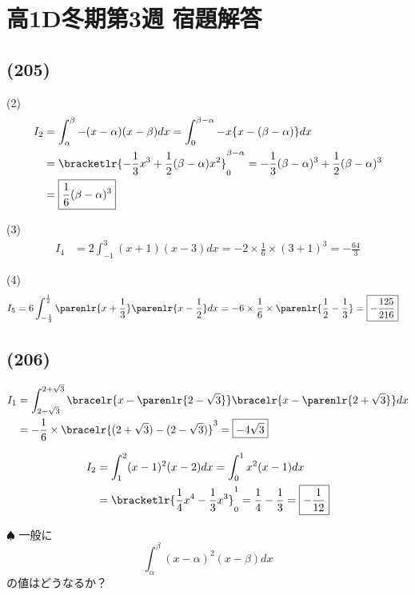 \documentclass[dvipdfmx,uplatex,b5paper]{jsarticle}
\begin{document}
\section*{高1D冬期第3週 宿題解答}
\subsection*{(205)}
\begin{enumarabicp}
  \item[(2)] \begin{align*}
    I_2 &= \int_\alpha^\beta -(x-\alpha)(x-\beta)dx
        = \int_0^{\beta-\alpha} -x\{x-(\beta-\alpha)\}dx \\
        &= \bracketlr{-\frac{1}{3}x^3+\frac{1}{2}(\beta-\alpha)x^2}_0^{\beta-\alpha}
        = -\frac{1}{3}(\beta-\alpha)^3+\frac{1}{2}(\beta-\alpha)^3 \\
        &= \boxed{\frac{1}{6}(\beta-\alpha)^3}
  \end{align*}
  \item[(3)] \begin{align*}
    I_4 &= 2\int_{-1}^3 (x+1)(x-3)dx 
        = -2\times \frac{1}{6}\times (3+1)^3 
        = \boxed{-\frac{64}{3}}
  \end{align*}
  \item[(4)] \begin{align*}
    I_5 &= 6\int_{-\frac{1}{3}}^{\frac{1}{2}} \parenlr{x+\frac{1}{3}}\parenlr{x-\frac{1}{2}} dx 
        =  -6\times \frac{1}{6}\times \parenlr{\frac{1}{2}-\frac{1}{3}}
        = \boxed{-\frac{125}{216}}
  \end{align*}
\end{enumarabicp}

\subsection*{(206)}
\begin{enumarabicp}
  \item \begin{align*}
    I_1 &= \int_{2-\sqrt{3}}^{2+\sqrt{3}} \bracelr{x-\parenlr{2-\sqrt{3}}} \bracelr{x-\parenlr{2+\sqrt{3}}} dx \\
        &= -\frac{1}{6}\times \bracelr{(2+\sqrt{3})-(2-\sqrt{3})}^3 = \boxed{-4\sqrt{3}}
  \end{align*}

  \item \begin{align*}
    I_2 &= \int_1^2 (x-1)^2(x-2)dx
        = \int_0^1 x^2(x-1)dx \\
        &= \bracketlr{\frac{1}{4}x^4-\frac{1}{3}x^3}_0^1
        = \frac{1}{4}-\frac{1}{3}=\boxed{-\frac{1}{12}}
  \end{align*}

  $\spadesuit$ 一般に
  \[\int_\alpha^\beta (x-\alpha)^2(x-\beta)dx \]
  の値はどうなるか？
\end{enumarabicp}
\end{document}
